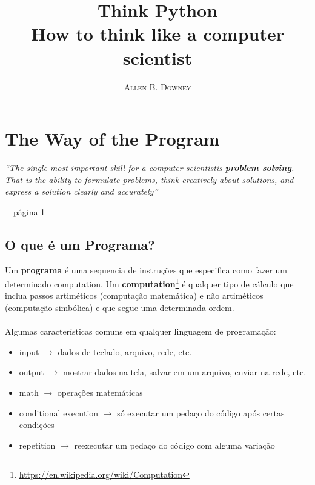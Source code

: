 \documentclass[a4paper,11pt]{book}
\title{\Huge \textbf{Think Python}  \\ \huge How to think like a computer scientist }
\author{\textsc{Allen B. Downey}}
\makeatletter
\newenvironment{chapquote}[2][2em]
  {\setlength{\@tempdima}{#1}%
   \def\chapquote@author{#2}%
   \parshape 1 \@tempdima \dimexpr\textwidth-2\@tempdima\relax%
   \itshape}
  {\par\normalfont\hfill--\ \chapquote@author\hspace*{\@tempdima}\par\bigskip}
\makeatother
\begin{document}
\frontmatter
\maketitle

\tableofcontents

\mainmatter

\chapter{The Way of the Program}

\begin{chapquote}{página 1}
	``The single most important skill for a computer scientistis \textbf{problem solving}. That is the 
	ability to formulate problems, think creatively about solutions, and express a solution clearly and 
	accurately''
\end{chapquote}

\section{O que é um Programa?}
Um \textbf{programa} é uma sequencia de instruções que especifica como fazer um determinado computation. Um \textbf{computation}\footnote{\href{https://en.wikipedia.org/wiki/Computation}{https://en.wikipedia.org/wiki/Computation}} é qualquer tipo de cálculo que inclua 
passos artiméticos (computação matemática) e não artiméticos (computação simbólica) e que segue uma determinada ordem.
\\
\\
Algumas características comuns em qualquer linguagem de programação:
\begin{itemize}
	\item input $\rightarrow$ dados de teclado, arquivo, rede, etc.
	\item output $\rightarrow$ mostrar dados na tela, salvar em um arquivo, enviar na rede, etc.
	\item math $\rightarrow$ operações matemáticas
	\item conditional execution $\rightarrow$ só executar um pedaço do código após certas condições
	\item repetition $\rightarrow$ reexecutar um pedaço do código com alguma variação
\end{itemize}
\end{document}
